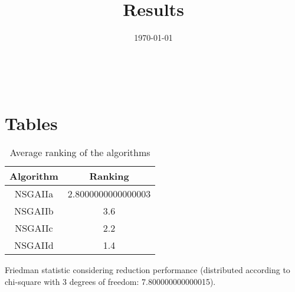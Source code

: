 \documentclass{article}
\title{Results}
\author{}
\date{\today}
\begin{document}
\oddsidemargin 0in \topmargin 0in\maketitle
\
\section{Tables}
\begin{table}[!htp]
\centering
\caption{Average ranking of the algorithms}
\begin{tabular}{c|c}
Algorithm&Ranking\\
\hline
NSGAIIa&2.8000000000000003\\
NSGAIIb&3.6\\
NSGAIIc&2.2\\
NSGAIId&1.4\\
\end{tabular}
\end{table}


Friedman statistic considering reduction performance (distributed according to chi-square with 3 degrees of freedom: 7.800000000000015).
\end{document}
